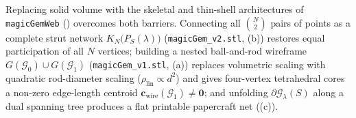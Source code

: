 Replacing solid volume with the skeletal and thin-shell architectures of \texttt{magicGemWeb} \citep{mathewson2025magicgemweb} () overcomes both barriers. Connecting all $\binom{N}{2}$ pairs of points as a complete strut network $K_N\bigl(P_S(\lambda)\bigr)$ (\texttt{magicGem\_v2.stl}, (b)) restores equal participation of all $N$ vertices; building a nested ball-and-rod wireframe $G(\mathcal G_0)\cup G(\mathcal G_1)$ (\texttt{magicGem\_v1.stl}, (a)) replaces volumetric scaling with quadratic rod-diameter scaling ($\rho_{\mathrm{lin}}\propto d^2$) and gives four-vertex tetrahedral cores a non-zero edge-length centroid $\mathbf c_{\mathrm{wire}}(\mathcal G_1)\ne\mathbf 0$; and unfolding $\partial\mathcal G_\lambda(S)$ along a dual spanning tree produces a flat printable papercraft net ((c)).

